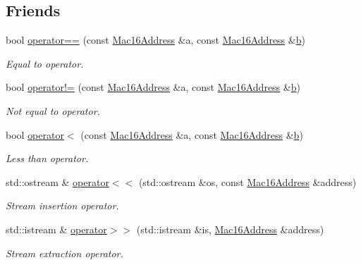 \subsection*{Friends}
\begin{DoxyCompactItemize}
\item 
bool \hyperlink{classns3_1_1Mac16Address_a7ccf4e86d2a41fb7cd4d1060fcc98ca3}{operator==} (const \hyperlink{classns3_1_1Mac16Address}{Mac16\+Address} \&a, const \hyperlink{classns3_1_1Mac16Address}{Mac16\+Address} \&\hyperlink{lte__pathloss_8m_a21ad0bd836b90d08f4cf640b4c298e7c}{b})
\begin{DoxyCompactList}\small\item\em Equal to operator. \end{DoxyCompactList}\item 
bool \hyperlink{classns3_1_1Mac16Address_a58956f791c23839ea5a38f7324d33ffc}{operator!=} (const \hyperlink{classns3_1_1Mac16Address}{Mac16\+Address} \&a, const \hyperlink{classns3_1_1Mac16Address}{Mac16\+Address} \&\hyperlink{lte__pathloss_8m_a21ad0bd836b90d08f4cf640b4c298e7c}{b})
\begin{DoxyCompactList}\small\item\em Not equal to operator. \end{DoxyCompactList}\item 
bool \hyperlink{classns3_1_1Mac16Address_a1728bfb916d36b4db00612350de5b47a}{operator$<$} (const \hyperlink{classns3_1_1Mac16Address}{Mac16\+Address} \&a, const \hyperlink{classns3_1_1Mac16Address}{Mac16\+Address} \&\hyperlink{lte__pathloss_8m_a21ad0bd836b90d08f4cf640b4c298e7c}{b})
\begin{DoxyCompactList}\small\item\em Less than operator. \end{DoxyCompactList}\item 
std\+::ostream \& \hyperlink{classns3_1_1Mac16Address_a58b82f380c2da21ef4059a32534e1cbd}{operator$<$$<$} (std\+::ostream \&os, const \hyperlink{classns3_1_1Mac16Address}{Mac16\+Address} \&address)
\begin{DoxyCompactList}\small\item\em Stream insertion operator. \end{DoxyCompactList}\item 
std\+::istream \& \hyperlink{classns3_1_1Mac16Address_a920e1787f1a5dbe51d6cbc92d212d025}{operator$>$$>$} (std\+::istream \&is, \hyperlink{classns3_1_1Mac16Address}{Mac16\+Address} \&address)
\begin{DoxyCompactList}\small\item\em Stream extraction operator. \end{DoxyCompactList}\end{DoxyCompactItemize}


